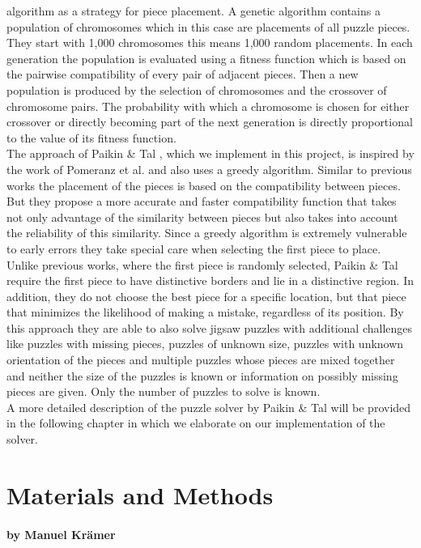 \documentclass[]{report}
\begin{document}
algorithm as a strategy for piece placement. A genetic algorithm contains a
population of chromosomes which in this case are placements of all puzzle
pieces. They start with 1,000 chromosomes this means 1,000 random placements. In
each generation the population is evaluated using a fitness function which is
based on the pairwise compatibility of every pair of adjacent pieces. Then a new
population is produced by the selection of chromosomes and the crossover of
chromosome pairs. The probability with which a chromosome is chosen for either
crossover or directly becoming part of the next generation is directly
proportional to the value of its fitness function. \\
The approach of Paikin \& Tal \cite{Paikin2015}, which we implement in this
project, is inspired by the work of Pomeranz et al. \cite{Pomeranz2011} and also
uses a greedy algorithm. Similar to previous works the placement of the pieces
is based on the compatibility between pieces. But they propose a more accurate
and faster compatibility function that takes not only advantage of the
similarity between pieces but also takes into account the reliability of this
similarity. Since a greedy algorithm is extremely vulnerable to early errors
they take special care when selecting the first piece to place. Unlike previous
works, where the first piece is randomly selected, Paikin \& Tal require the first piece
to have distinctive borders and lie in a distinctive region. In addition, they
do not choose the best piece for a specific location, but that piece that
minimizes the likelihood of making a mistake, regardless of its position. By
this approach they are able to also solve jigsaw puzzles with additional
challenges like puzzles with missing pieces, puzzles of unknown size, puzzles
with unknown orientation of the pieces and multiple puzzles whose pieces are
mixed together and neither the size of the puzzles is known or information on
possibly missing pieces are given. Only the number of puzzles to solve is known. \\
A more detailed description of the puzzle solver by Paikin \& Tal will be
provided in the following chapter in which we elaborate on our implementation of
the solver.

\chapter{Materials and Methods}
\subsubsection*{by Manuel Krämer}
\end{document}
